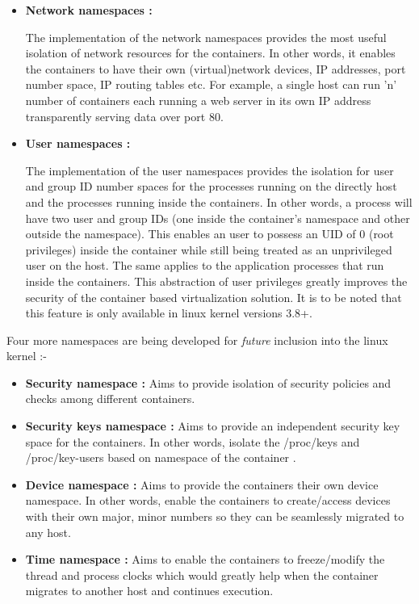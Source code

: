 \begin{itemize}
\item \textbf{Network namespaces :}

The implementation of the network namespaces provides the most useful isolation of network resources for the containers. In other words, it enables the containers to have their own (virtual)network devices, IP addresses, port number space, IP routing tables etc. For example, a single host can run 'n' number of containers each running a web server in its own IP address transparently serving data over port 80.


\item \textbf{User namespaces :}

The implementation of the user namespaces provides the isolation for user and group ID number spaces for the processes running on the directly host and the processes running inside the containers. In other words, a process will have two user and group IDs (one inside the container's namespace and other outside the namespace). This enables an user to possess an UID of 0 (root privileges) inside the container while still being treated as an unprivileged user on the host. The same applies to the application processes that run inside the containers. This abstraction of user privileges greatly improves the security of the container based virtualization solution. It is to be noted that this feature is only available in linux kernel versions 3.8+.
\end{itemize}


Four more namespaces are being developed for \emph{future} inclusion into the linux kernel \cite{linux_namespaces_plan}:-


\begin{itemize}

\item \textbf{Security namespace :} Aims to provide isolation of security policies and checks among different containers.

\item \textbf{Security keys namespace :} Aims to provide an independent security key space for the containers. In other words, isolate the /proc/keys and /proc/key-users based on namespace of the container \cite{key_namespace}.

\item \textbf{Device namespace :} Aims to provide the containers their own device namespace. In other words, enable the containers to create/access devices with their own major, minor numbers so they can be seamlessly migrated to any host.

\item \textbf{Time namespace :} Aims to enable the containers to freeze/modify the thread and process clocks which would greatly help when the container migrates to another host and continues execution.

\end{itemize}




